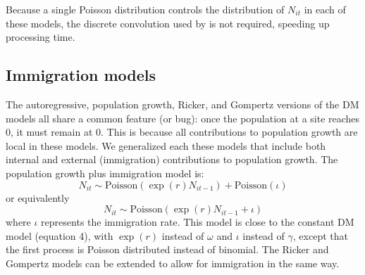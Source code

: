 \documentclass[12pt]{article}
\begin{document}
Because a single Poisson distribution controls the
distribution of $N_{it}$ in each of these models, the discrete
convolution used by \citet{dail_madsen:2011} is not required,
speeding up processing time.

\subsection{Immigration models}

The autoregressive, population growth, Ricker, and Gompertz
versions of the DM models all share a common feature (or bug):
once the population at a site reaches 0, it must remain at 0.
This is because all contributions to population growth are
local in these models.  We generalized each these models that
include both internal and external (immigration) contributions
to population growth.  The population growth plus immigration
model is:
\begin{equation}
  N_{it} \sim \text{Poisson}(\exp(r)N_{it-1}) + \text{Poisson}(\iota)
  \label{eq:expimm1}
\end{equation}
or equivalently
\begin{equation}
  N_{it} \sim \text{Poisson}(\exp(r)N_{it-1} + \iota)
  \label{eq:expimm2}
\end{equation}
where $\iota$ represents the immigration rate.  This model is close to
the constant DM model (equation 4), with $\exp(r)$ instead of $\omega$
and $\iota$ instead of $\gamma$, except that the first
process is Poisson distributed instead of binomial. The Ricker and
Gompertz models can be extended to allow for immigration in the same
way.

\end{document}
